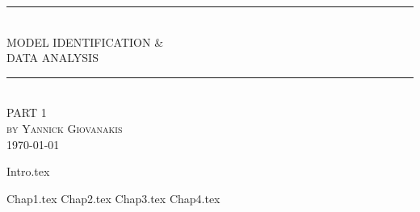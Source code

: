 \documentclass[12pt]{article} %
\begin{document}

\begin{titlepage}

\newcommand{\HRule}{\rule{\linewidth}{0.5mm}} %

\center %
\HRule \\[0.5cm]
{ \LARGE  MODEL IDENTIFICATION \& \\ DATA ANALYSIS}\\[0.8cm] %
\HRule \\[1.5cm]
\textsc{\large PART 1}\\[0.5cm] %
\textsc{\large by Yannick Giovanakis}\\[5.5cm] %

\vfill
{\large \today}\\[3cm] %
\end{titlepage}


\tableofcontents %

\newpage %

{Intro.tex}

\newpage
{Chap1.tex}
\newpage
{Chap2.tex}
\newpage
{Chap3.tex}
\newpage
{Chap4.tex}
\end{document}
